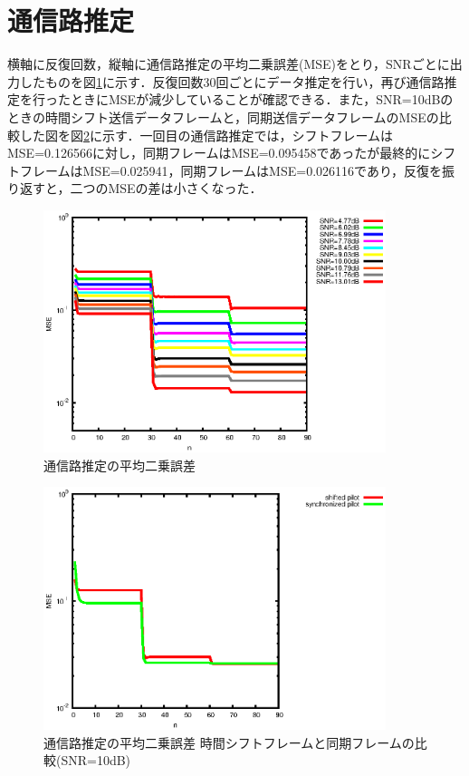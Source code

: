 \section{通信路推定}
横軸に反復回数，縦軸に通信路推定の平均二乗誤差(MSE)をとり，SNRごとに出力したものを図\ref{fig:mse_h}に示す．反復回数30回ごとにデータ推定を行い，再び通信路推定を行ったときにMSEが減少していることが確認できる．また，SNR=10dBのときの時間シフト送信データフレームと，同期送信データフレームのMSEの比較した図を図\ref{fig:mse_h_comparison}に示す．一回目の通信路推定では，シフトフレームはMSE=0.126566に対し，同期フレームはMSE=0.095458であったが最終的にシフトフレームはMSE=0.025941，同期フレームはMSE=0.026116であり，反復を振り返すと，二つのMSEの差は小さくなった．
\begin{figure}[htbp]
  \begin{center}
    \includegraphics[clip,width=10.0cm]{./mse_h.eps}
    \caption{通信路推定の平均二乗誤差}
    \label{fig:mse_h}
  \end{center}
\end{figure}

\begin{figure}[htbp]
  \begin{center}
    \includegraphics[clip,width=10.0cm]{./mse_h_comparison.eps}
    \caption{通信路推定の平均二乗誤差 時間シフトフレームと同期フレームの比較(SNR=10dB)}
    \label{fig:mse_h_comparison}
  \end{center}
\end{figure}
